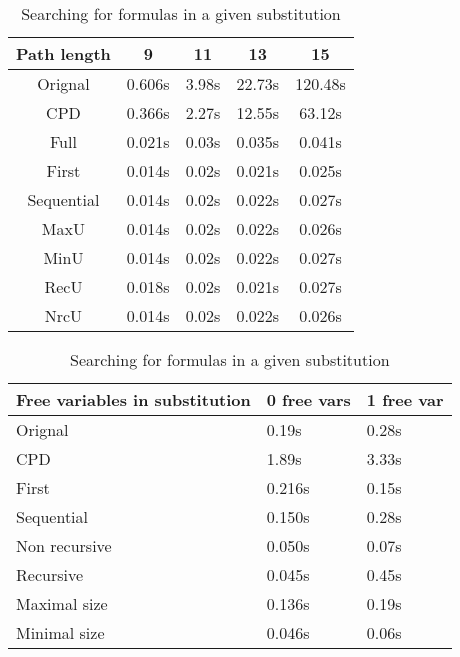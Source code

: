 \documentclass[submission,copyright,creativecommons]{eptcs}
\begin{document}
\begin{table}[ht]


\parbox{.5\textwidth} {
\begin{tabular}{|c|c|c|c|c|}
\hline
Path length & 9 & 11 & 13 & 15 \\ \hline
\hline
Orignal    & 0.606s & 3.98s & 22.73s & 120.48s \\
CPD        & 0.366s & 2.27s & 12.55s & 63.12s \\ \hline
Full       & 0.021s & 0.03s & 0.035s & 0.041s \\
First      & 0.014s & 0.02s & 0.021s & 0.025s \\
Sequential & 0.014s & 0.02s & 0.022s & 0.027s \\
MaxU       & 0.014s & 0.02s & 0.022s & 0.026s \\
MinU       & 0.014s & 0.02s & 0.022s & 0.027s \\
RecU       & 0.018s & 0.02s & 0.021s & 0.027s \\
NrcU       & 0.014s & 0.02s & 0.022s & 0.026s \\
\hline
\end{tabular}
\label{tab:paths}
\caption{Searching for paths in the $K_{10}$ graph}
}
\quad
\quad
\parbox{.4\textwidth}{
\begin{tabular}{|p{3cm}|l|l|}
\hline
Free variables in substitution & 0 free vars & 1 free var  \\ \hline
\hline
Orignal       & 0.19s  & 0.28s \\
CPD           & 1.89s  & 3.33s \\
\hline
First         & 0.216s & 0.15s \\
Sequential    & 0.150s & 0.28s \\
Non recursive & 0.050s & 0.07s \\
Recursive     & 0.045s & 0.45s \\
Maximal size  & 0.136s & 0.19s \\
Minimal size  & 0.046s & 0.06s \\
\hline
\end{tabular}
\label{tab:logic}
\caption{Searching for formulas in a given substitution}
}
\end{table}



\end{document}
